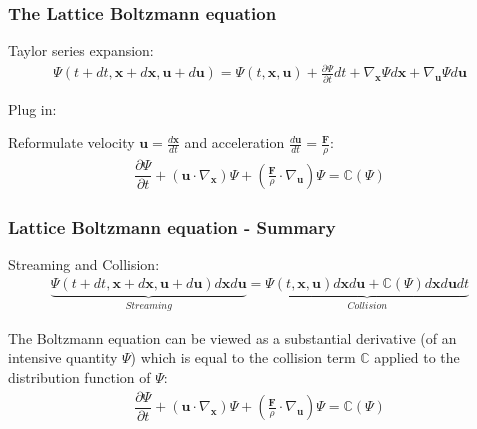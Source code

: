 \documentclass[10pt]{beamer}
\begin{document}
\begin{frame}\frametitle{The Lattice Boltzmann equation}

Taylor series expansion:
\begin{eqnarray} 
	 \Psi(t +dt, \textbf{x} + d\textbf{x}, \textbf{u} + d\textbf{u}) =
	 \Psi(t, \textbf{x}, \textbf{u}) + \frac{\partial \Psi}{\partial t} dt + 
	 \nabla_{\textbf{x}}\Psi d\textbf{x} +
	 \nabla_{\textbf{u}}\Psi d\textbf{u} \nonumber
\end{eqnarray}

\pause
Plug in:

\pause
Reformulate velocity $ \textbf{u} = \frac{d\textbf{x} }{dt}$ and acceleration 
$ \frac{d \textbf{u}}{dt} =  \frac{\textbf{F}}{\rho}$:
\begin{eqnarray} \label{Boltzmann_equation_withForce}
	\dfrac{\partial \Psi}{\partial t} + (\textbf{u} \cdot \nabla_{\textbf{x}}) \Psi +
	 (\frac{\textbf{F}}{\rho} \cdot \nabla_{\textbf{u}}) \Psi 
	 = \mathbb{C}(\Psi) \nonumber
\end{eqnarray}
\end{frame} 

\begin{frame}\frametitle{Lattice Boltzmann equation - Summary}
Streaming and Collision:
\begin{eqnarray}
	 \underbrace{ \Psi(t +dt, \textbf{x} + d\textbf{x}, \textbf{u} + d\textbf{u})  d\textbf{x} d\textbf{u} }_{Streaming}=
	 \underbrace{\Psi(t, \textbf{x}, \textbf{u}) d\textbf{x} d\textbf{u} + \mathbb{C}(\Psi)  d\textbf{x} d\textbf{u} dt}_{Collision}  \nonumber
\end{eqnarray} 

The Boltzmann equation can be viewed as a substantial derivative (of an intensive quantity $\Psi$) which is equal to the collision term $ \mathbb{C}$ applied to the distribution function of $\Psi$:
\begin{eqnarray}
	\dfrac{\partial \Psi}{\partial t} + (\textbf{u} \cdot \nabla_{\textbf{x}}) \Psi +
	 (\frac{\textbf{F}}{\rho} \cdot \nabla_{\textbf{u}}) \Psi 
	 = \mathbb{C}(\Psi) \nonumber
\end{eqnarray}
\end{frame}
\end{document}

